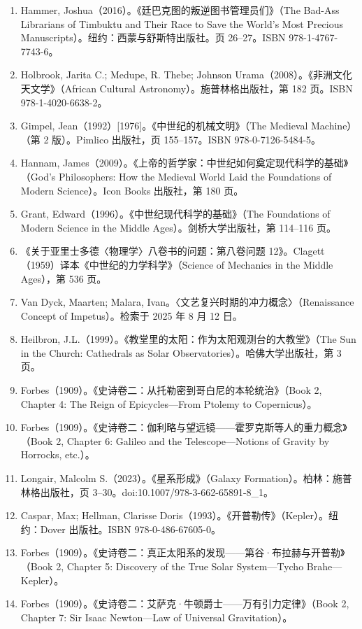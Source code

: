 \begin{enumerate}
  \item Hammer, Joshua（2016）。《廷巴克图的叛逆图书管理员们》（The Bad-Ass Librarians of Timbuktu and Their Race to Save the World’s Most Precious Manuscripts）。纽约：西蒙与舒斯特出版社。页 26–27。ISBN 978-1-4767-7743-6。
  \item Holbrook, Jarita C.; Medupe, R. Thebe; Johnson Urama（2008）。《非洲文化天文学》（African Cultural Astronomy）。施普林格出版社，第 182 页。ISBN 978-1-4020-6638-2。
  \item Gimpel, Jean（1992）[1976]。《中世纪的机械文明》（The Medieval Machine）（第 2 版）。Pimlico 出版社，页 155–157。ISBN 978-0-7126-5484-5。
  \item Hannam, James（2009）。《上帝的哲学家：中世纪如何奠定现代科学的基础》（God’s Philosophers: How the Medieval World Laid the Foundations of Modern Science）。Icon Books 出版社，第 180 页。
  \item Grant, Edward（1996）。《中世纪现代科学的基础》（The Foundations of Modern Science in the Middle Ages）。剑桥大学出版社，第 114–116 页。
  \item 《关于亚里士多德〈物理学〉八卷书的问题：第八卷问题 12》。Clagett（1959）译本《中世纪的力学科学》（Science of Mechanics in the Middle Ages），第 536 页。
  \item Van Dyck, Maarten; Malara, Ivan。〈文艺复兴时期的冲力概念〉（Renaissance Concept of Impetus）。检索于 2025 年 8 月 12 日。
  \item Heilbron, J.L.（1999）。《教堂里的太阳：作为太阳观测台的大教堂》（The Sun in the Church: Cathedrals as Solar Observatories）。哈佛大学出版社，第 3 页。
  \item Forbes（1909）。《史诗卷二：从托勒密到哥白尼的本轮统治》（Book 2, Chapter 4: The Reign of Epicycles—From Ptolemy to Copernicus）。
  \item Forbes（1909）。《史诗卷二：伽利略与望远镜——霍罗克斯等人的重力概念》（Book 2, Chapter 6: Galileo and the Telescope—Notions of Gravity by Horrocks, etc.）。
  \item Longair, Malcolm S.（2023）。《星系形成》（Galaxy Formation）。柏林：施普林格出版社，页 3–30。doi:10.1007/978-3-662-65891-8\_1。
  \item Caspar, Max; Hellman, Clarisse Doris（1993）。《开普勒传》（Kepler）。纽约：Dover 出版社。ISBN 978-0-486-67605-0。
  \item Forbes（1909）。《史诗卷二：真正太阳系的发现——第谷·布拉赫与开普勒》（Book 2, Chapter 5: Discovery of the True Solar System—Tycho Brahe—Kepler）。
  \item Forbes（1909）。《史诗卷二：艾萨克·牛顿爵士——万有引力定律》（Book 2, Chapter 7: Sir Isaac Newton—Law of Universal Gravitation）。

\end{enumerate}
